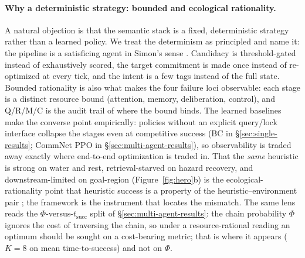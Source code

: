 \documentclass{article}
\begin{document}
\paragraph{Why a deterministic strategy: bounded and ecological rationality.}
A natural objection is that the semantic stack is a fixed, deterministic strategy rather than a learned policy. We treat the determinism as principled and name it: the pipeline is a satisficing agent in Simon's sense \citep{simon1955behavioral,simon1956rational}. Candidacy is threshold-gated instead of exhaustively scored, the target commitment is made once instead of re-optimized at every tick, and the intent is a few tags instead of the full state. Bounded rationality is also what makes the four failure loci observable: each stage is a distinct resource bound (attention, memory, deliberation, control), and Q/R/M/C is the audit trail of where the bound binds. The learned baselines make the converse point empirically: policies without an explicit query/lock interface collapse the stages even at competitive success (BC in \S\ref{sec:single-results}; CommNet PPO in \S\ref{sec:multi-agent-results}), so observability is traded away exactly where end-to-end optimization is traded in. That the \emph{same} heuristic is strong on water and rest, retrieval-starved on hazard recovery, and downstream-limited on goal-region (Figure~\ref{fig:hero}b) is the ecological-rationality point that heuristic success is a property of the heuristic--environment pair \citep{simon1956rational,gigerenzer1996reasoning}; the framework is the instrument that locates the mismatch. The same lens reads the $\Phi$-versus-$t_{\mathrm{succ}}$ split of \S\ref{sec:multi-agent-results}: the chain probability $\Phi$ ignores the cost of traversing the chain, so under a resource-rational reading \citep{lieder2020resource} an optimum should be sought on a cost-bearing metric; that is where it appears ($K{=}8$ on mean time-to-success) and not on $\Phi$.
\end{document}

